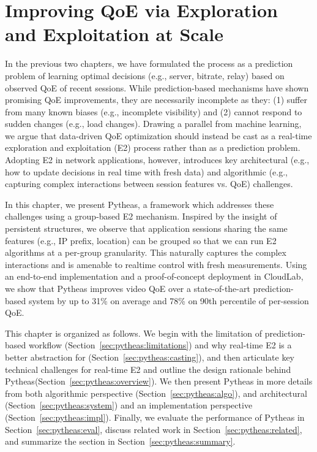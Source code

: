 \chapter{Improving QoE via Exploration and Exploitation at Scale}
\label{ch:pytheas}


\renewcommand{\name}{{Pytheas}\xspace}
\providecommand{\mab}{{E2}\xspace}
\providecommand{\mablong}{{exploration and exploitation}\xspace}
\providecommand{\control}{{control}\xspace}
\providecommand{\idea}{{group-based \mab}\xspace}
\providecommand{\Idea}{{Group-based \mab}\xspace}

In the previous two chapters,
we have formulated the \ddn process as a
prediction problem of learning optimal decisions (e.g.,
server, bitrate, relay) based on observed QoE of recent
sessions. While prediction-based mechanisms have
shown promising QoE improvements, they are necessarily
incomplete as they: (1) suffer from many known biases
(e.g., incomplete visibility) and (2) cannot respond
to sudden changes (e.g., load changes). Drawing a parallel
from machine learning, we argue that data-driven
QoE optimization should instead be cast as a real-time
exploration and exploitation (E2) process rather than as
a prediction problem. Adopting E2 in network applications,
however, introduces key architectural (e.g., how
to update decisions in real time with fresh data) and algorithmic
(e.g., capturing complex interactions between
session features vs. QoE) challenges. 

In this chapter, we present Pytheas,
a framework which addresses these challenges using
a group-based E2 mechanism. 
Inspired by the insight of persistent structures, we
observe that application
sessions sharing the same features (e.g., IP prefix, 
location) can be grouped so that we can run E2 algorithms
at a per-group granularity. This naturally captures
the complex interactions and is amenable to realtime
control with fresh measurements. Using an end-to-end
implementation and a proof-of-concept deployment
in CloudLab, we show that Pytheas improves video
QoE over a state-of-the-art prediction-based system by
up to 31\% on average and 78\% on 90th percentile of 
per-session QoE.

This chapter is organized as follows.
We begin with the limitation of prediction-based workflow (Section~\ref{sec:pytheas:limitations}) 
and why real-time \mab is a better abstraction
for \ddn (Section~\ref{sec:pytheas:casting}),
and then articulate key technical challenges for real-time \mab and outline the design rationale behind \name (Section~\ref{sec:pytheas:overview}).
We then present \name in more details from both algorithmic perspective (Section~\ref{sec:pytheas:algo}), and architectural (Section~\ref{sec:pytheas:system}) and an implementation perspective (Section~\ref{sec:pytheas:impl}).
Finally, we evaluate the performance of \name in Section~\ref{sec:pytheas:eval}, discuss related work in Section~\ref{sec:pytheas:related}, and summarize the section in Section~\ref{sec:pytheas:summary}.

